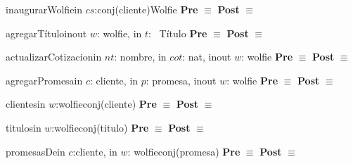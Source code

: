 	\begin{interfaz}{inaugurarWolfie}{in $cs$:conj(cliente)}{Wolfie}{}
	\textbf{Pre} $\equiv$ 
	\textbf{Post} $\equiv$ 
	\end{interfaz}

	\begin{interfaz}{agregarT\'itulo}{inout $w$: wolfie, in $t$: \ T\'itulo}{}{}
	\textbf{Pre} $\equiv$ 
	\textbf{Post} $\equiv$ 
	\end{interfaz}

	\begin{interfaz}{actualizarCotizacion}{in $nt$: nombre, in $cot$: nat, inout $w$: wolfie}{}{}
	\textbf{Pre} $\equiv$ 
	\textbf{Post} $\equiv$ 
	\end{interfaz}

	\begin{interfaz}{agregarPromesa}{in $c$: cliente, in $p$: promesa, inout $w$: wolfie}{}{}
	\textbf{Pre} $\equiv$ 
	\textbf{Post} $\equiv$ 
	\end{interfaz}

	\begin{interfaz}{clientes}{in $w$:wolfie}{conj(cliente)}{}
	\textbf{Pre} $\equiv$ 
	\textbf{Post} $\equiv$ 
	\end{interfaz}

	\begin{interfaz}{titulos}{in $w$:wolfie}{conj(titulo)}{}
	\textbf{Pre} $\equiv$ 
	\textbf{Post} $\equiv$ 
	\end{interfaz}

	\begin{interfaz}{promesasDe}{in $c$:cliente, in $w$: wolfie}{conj(promesa)}{}
	\textbf{Pre} $\equiv$ 
	\textbf{Post} $\equiv$ 
	\end{interfaz}

